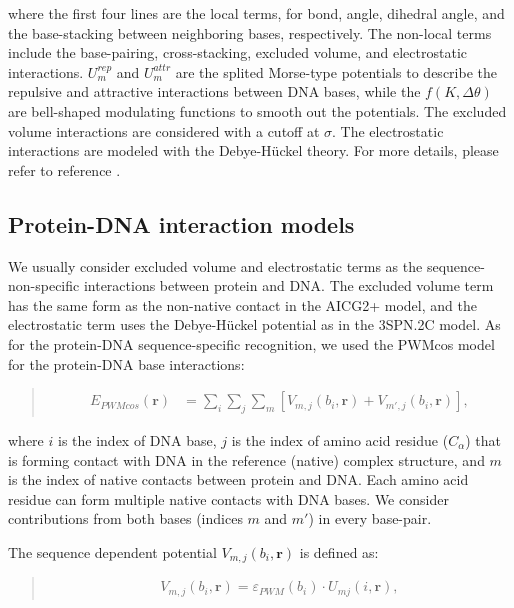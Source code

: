 \documentclass[a4paper,11pt,oneside,english]{sphinxmanual}
\begin{document}
where the first four lines are the local terms, for bond, angle, dihedral angle,
and the base-stacking between neighboring bases, respectively.  The non-local
terms include the base-pairing, cross-stacking, excluded volume, and
electrostatic interactions.  \(U_m^{rep}\) and \(U_m^{attr}\) are the
splited Morse-type potentials to describe the repulsive and attractive
interactions between DNA bases, while the \(f(K, \Delta\theta)\) are
bell-shaped modulating functions to smooth out the potentials.  The excluded
volume interactions are considered with a cutoff at \(\sigma\).  The
electrostatic interactions are modeled with the Debye-Hückel theory.  For more
details, please refer to reference .


\subsection{Protein-DNA interaction models}
\label{\detokenize{05_Energy:protein-dna-interaction-models}}
We usually consider excluded volume and electrostatic terms as the
sequence-non-specific interactions between protein and DNA.  The excluded volume
term has the same form as the non-native contact in the AICG2+ model, and the
electrostatic term uses the Debye-Hückel potential as in the 3SPN.2C model. As
for the protein-DNA sequence-specific recognition, we used the PWMcos model for
the protein-DNA base interactions: 
\begin{quote}

\vspace{-5mm}
\begin{equation*}
\begin{split}E_{PWMcos}(\mathbf{r}) & = \sum_{i} \sum_{j} \sum_{m}\left[ V_{m,j}(b_i, \mathbf{r}) +  V_{m',j}(b_i, \mathbf{r}) \right],\end{split}
\end{equation*}
\vspace{-3mm}
\end{quote}

where \(i\) is the index of DNA base, \(j\) is the index of amino acid
residue (\(C_\alpha\)) that is forming contact with DNA in the reference
(native) complex structure, and \(m\) is the index of native contacts
between protein and DNA.  Each amino acid residue can form multiple native
contacts with DNA bases.  We consider contributions from both bases (indices
\(m\) and \(m'\)) in every base-pair.

The sequence dependent potential \(V_{m, j} (b_i, \mathbf{r})\) is defined as:
\begin{quote}

\vspace{-5mm}
\begin{equation*}
\begin{split}V_{m, j} (b_i, \mathbf{r}) = \varepsilon_{PWM}(b_i) \cdot U_{mj} (i, \mathbf{r}),\end{split}
\end{equation*}
\vspace{-3mm}
\end{quote}
\end{document}
